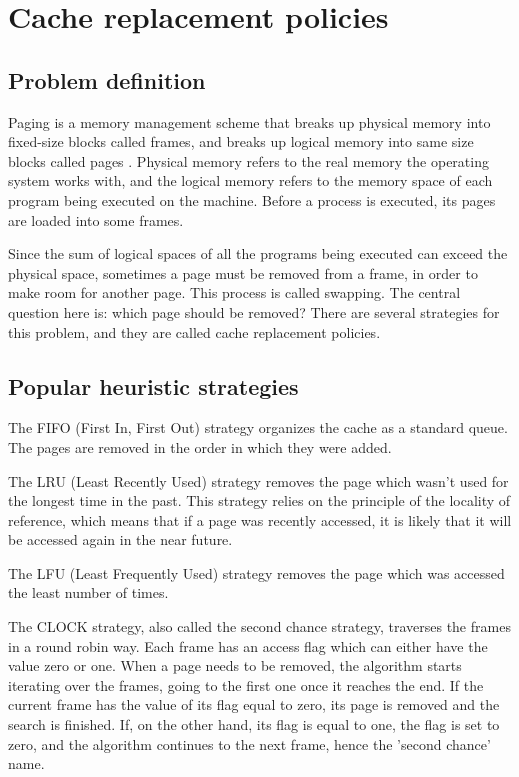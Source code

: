 \section{Cache replacement policies}
\subsection{Problem definition}
Paging is a memory management scheme that breaks up physical memory into fixed-size blocks called frames, and breaks up logical memory into same size blocks called pages \citep{silberschatz2018operatingsystem}. Physical memory refers to the real memory the operating system works with, and the logical memory refers to the memory space of each program being executed on the machine. Before a process is executed, its pages are loaded into some frames.

Since the sum of logical spaces of all the programs being executed can exceed the physical space, sometimes a page must be removed from a frame, in order to make room for another page. This process is called swapping. The central question here is: which page should be removed? There are several strategies for this problem, and they are called cache replacement policies.

\subsection{Popular heuristic strategies}
The FIFO (First In, First Out) strategy organizes the cache as a standard queue. The pages are removed in the order in which they were added.

The LRU (Least Recently Used) strategy removes the page which wasn't used for the longest time in the past. This strategy relies on the principle of the locality of reference, which means that if a page was recently accessed, it is likely that it will be accessed again in the near future.

The LFU (Least Frequently Used) strategy removes the page which was accessed the least number of times.

The CLOCK strategy, also called the second chance strategy, traverses the frames in a round robin way. Each frame has an access flag which can either have the value zero or one. When a page needs to be removed, the algorithm starts iterating over the frames, going to the first one once it reaches the end. If the current frame has the value of its flag equal to zero, its page is removed and the search is finished. If, on the other hand, its flag is equal to one, the flag is set to zero, and the algorithm continues to the next frame, hence the 'second chance' name.

